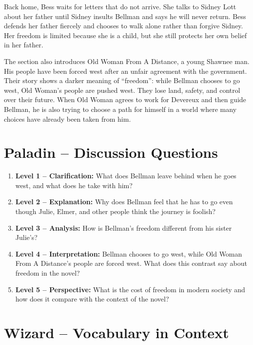 \documentclass[11pt,a4paper]{article}
\begin{document}
Back home, Bess waits for letters that do not arrive. She talks to Sidney Lott about her father until Sidney insults Bellman and says he will never return. Bess defends her father fiercely and chooses to walk alone rather than forgive Sidney. Her freedom is limited because she is a child, but she still protects her own belief in her father.

The section also introduces Old Woman From A Distance, a young Shawnee man. His people have been forced west after an unfair agreement with the government. Their story shows a darker meaning of ``freedom'': while Bellman chooses to go west, Old Woman's people are pushed west. They lose land, safety, and control over their future. When Old Woman agrees to work for Devereux and then guide Bellman, he is also trying to choose a path for himself in a world where many choices have already been taken from him.

\newpage

\section{Paladin -- Discussion Questions}

\begin{enumerate}[label=\textbf{\arabic*.}, leftmargin=*]
    \item \textbf{Level 1 -- Clarification:} What does Bellman leave behind when he goes west, and what does he take with him?
    \item \textbf{Level 2 -- Explanation:} Why does Bellman feel that he has to go even though Julie, Elmer, and other people think the journey is foolish?
    \item \textbf{Level 3 -- Analysis:} How is Bellman's freedom different from his sister Julie's?
    \item \textbf{Level 4 -- Interpretation:} Bellman chooses to go west, while Old Woman From A Distance's people are forced west. What does this contrast say about freedom in the novel?
    \item \textbf{Level 5 -- Perspective:} What is the cost of freedom in modern society and how does it compare with the context of the novel?
  \end{enumerate}

\newpage

\section{Wizard -- Vocabulary in Context}
\end{document}
